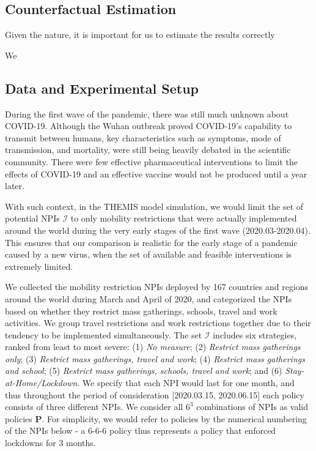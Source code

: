 \documentclass[msom,blindrev]{informs3} %
\begin{document}
\subsection{Counterfactual Estimation}

Given the nature, it is important for us to estimate the results correctly 

We 

\subsection{Data and Experimental Setup}
\label{subsec:data}
During the first wave of the pandemic, there was still much unknown about COVID-19. Although the Wuhan outbreak proved COVID-19's capability to transmit between humans, key characteristics such as symptoms, mode of transmission, and mortality, were still being heavily debated in the scientific community. There were few effective pharmaceutical interventions to limit the effects of COVID-19 and an effective vaccine would not be produced until a year later. 

With such context, in the THEMIS model simulation, we would limit the set of potential NPIs $\mathcal{I}$ to only mobility restrictions that were actually implemented around the world during the very early stages of the first wave (2020.03-2020.04). This ensures that our comparison is realistic for the early stage of a pandemic caused by a new virus, when the set of available and feasible interventions is extremely limited. 

We collected the mobility restriction NPIs deployed by 167 countries and regions around the world during March and April of 2020, and categorized the NPIs based on whether they restrict mass gatherings, schools, travel and work activities. We group travel restrictions and work restrictions together due to their tendency to be implemented simultaneously. The set $\mathcal{I}$ includes six  strategies, ranked from least to most severe: (1) \emph{No measure}; (2) \emph{Restrict mass gatherings only}; (3) \emph{Restrict mass gatherings, travel and work}; (4) \emph{Restrict mass gatherings and school};  (5) \emph{Restrict mass gatherings, schools, travel and work}; and (6) \emph{Stay-at-Home/Lockdown}. We specify that each NPI would last for one month, and thus throughout the period of consideration [2020.03.15, 2020.06.15] each policy consists of three different NPIs. We consider all $6^3$ combinations of NPIs as valid policies $\bm{P}$. For simplicity, we would refer to policies by the numerical numbering of the NPIs below - a 6-6-6 policy thus represents a policy that enforced lockdowns for 3 months. 
\end{document}
